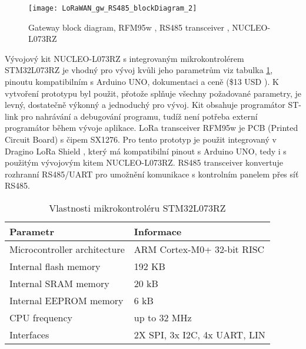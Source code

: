 \begin{figure}[!h]
    \centering
    \texttt{[image: LoRaWAN\_gw\_RS485\_blockDiagram\_2]}
    \caption{Gateway block diagram, RFM95w \cite{RFM95w}, RS485 transceiver \cite{rs485tr}, NUCLEO-L073RZ \cite{nucleoST}}
    \label{fig:gatewayBlockDiagram}
\end{figure}

Vývojový kit NUCLEO-L073RZ s integrovaným mikrokontrolérem STM32L073RZ je vhodný pro vývoj kvůli jeho parametrům viz tabulka \ref{tab:mcuFeatures}, pinoutu kompatibilním s Arduino UNO, dokumentaci a ceně (\$13 USD \cite{nucleoST}). 
K vytvoření prototypu byl použit, přotože splňuje všechny požadované parametry, je levný, dostatečně výkonný a jednoduchý pro vývoj. Kit obsahuje programátor ST-link pro nahrávání a debugování programu, tudíž není potřeba externí programátor během vývoje aplikace.
LoRa transceiver RFM95w je PCB (Printed Circuit Board) s čipem SX1276. Pro tento prototyp je použit integrovaný v Dragino LoRa Shield \cite{draginoWiki}, který má kompatibilní pinout s Arduino UNO, tedy i s použitým vývojovým kitem NUCLEO-L073RZ.
RS485 transceiver konvertuje rozhranní RS485/UART pro umožnění komunikace s kontrolním panelem přes síť RS485.

\begin{table}[!h]
    \centering
    \footnotesize
    \caption{Vlastnosti mikrokontroléru STM32L073RZ \cite{nucleoST}}
    \begin{ctucolortab}
    \begin{tabular}{|l|p{3.5cm}|}
    \hline

    Parametr          & Informace            \\ \hline \hline

    Microcontroller architecture & ARM Cortex-M0+ 32-bit RISC \\ \hline
    Internal flash memory & 192 KB \\ \hline
    Internal SRAM memory & 20 kB \\ \hline
    Internal EEPROM memory & 6 kB \\ \hline
    CPU frequency & up to 32 MHz \\ \hline
    Interfaces & 2X SPI, 3x I2C, 4x UART, LIN \\ \hline
    \end{tabular}
    \end{ctucolortab}
    \label{tab:mcuFeatures}
\end{table}


